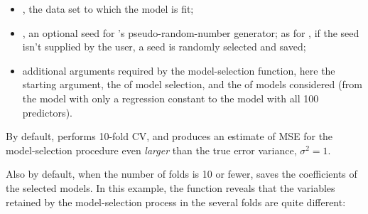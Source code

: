 \documentclass[
]{jss}
\providecommand{\tightlist}{%
  \setlength{\itemsep}{0pt}\setlength{\parskip}{0pt}}
\begin{document}
\begin{itemize}
\tightlist
\item
  , the data set to which the model is fit;
\item
  , an optional seed for 's pseudo-random-number
  generator; as for , if the seed isn't supplied by the user,
  a seed is randomly selected and saved;
\item
  additional arguments required by the model-selection function, here
  the starting  argument, the  of model
  selection, and the  of models considered (from the model
  with only a regression constant to the model with all 100 predictors).
\end{itemize}

By default,  performs 10-fold CV, and produces an
estimate of MSE for the model-selection procedure even \emph{larger}
than the true error variance, \(\sigma^2 = 1\).

Also by default, when the number of folds is 10 or fewer,
 saves the coefficients of the selected models. In this
example, the  function reveals that the variables
retained by the model-selection process in the several folds are quite
different:
\end{document}
